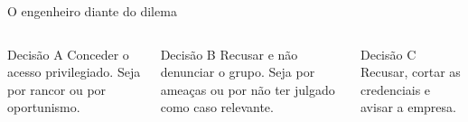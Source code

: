 \begin{frame}{O engenheiro diante do dilema}
  \begin{columns}[t,onlytextwidth]
    \begin{cefetblock}{Decisão A}
      \small
      Conceder o acesso privilegiado.
      Seja por rancor ou por oportunismo.
    \end{cefetblock}
    \begin{cefetblock}{Decisão B}
      \small
      Recusar e não denunciar o grupo.
      Seja por ameaças ou por não ter julgado como caso relevante.
    \end{cefetblock}
    \begin{cefetexampleblock}{Decisão C}
      \small
      Recusar, cortar as credenciais e avisar a empresa.
    \end{cefetexampleblock}
  \end{columns}
\end{frame}
